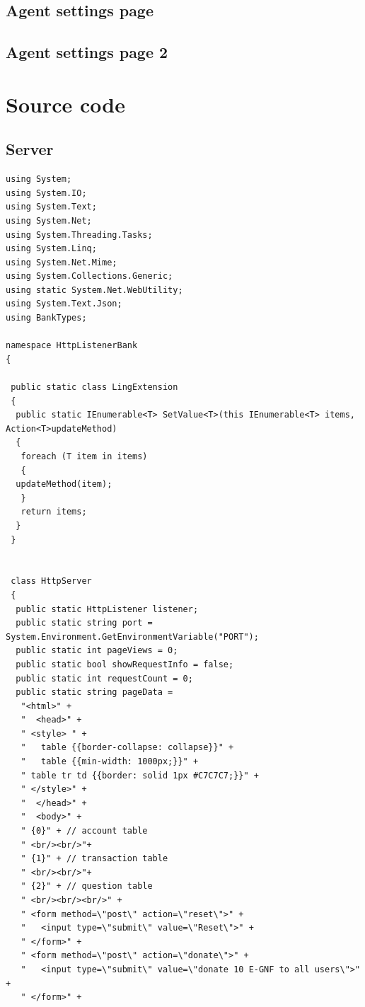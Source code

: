 \documentclass[11pt, a4paper]{article}
\begin{document}
\begin{appendices}

\subsection{Agent settings page} %
\label{sub:agent_settings_page}


\subsection{Agent settings page 2} %
\label{sub:agent_settings_page_2}


\section{Source code}
\subsection{Server} %
\label{sub:server}
\begin{lstlisting}
using System;
using System.IO;
using System.Text;
using System.Net;
using System.Threading.Tasks;
using System.Linq;
using System.Net.Mime;
using System.Collections.Generic;
using static System.Net.WebUtility;
using System.Text.Json;
using BankTypes;

namespace HttpListenerBank
{

 public static class LingExtension
 {
  public static IEnumerable<T> SetValue<T>(this IEnumerable<T> items, Action<T>updateMethod)
  {
   foreach (T item in items)
   {
  updateMethod(item);
   }
   return items;
  }
 }


 class HttpServer
 {
  public static HttpListener listener;
  public static string port = System.Environment.GetEnvironmentVariable("PORT");
  public static int pageViews = 0;
  public static bool showRequestInfo = false;
  public static int requestCount = 0;
  public static string pageData =
   "<html>" +
   "  <head>" +
   " <style> " +
   "   table {{border-collapse: collapse}}" +
   "   table {{min-width: 1000px;}}" +
   " table tr td {{border: solid 1px #C7C7C7;}}" +
   " </style>" +
   "  </head>" +
   "  <body>" +
   " {0}" + // account table
   " <br/><br/>"+
   " {1}" + // transaction table
   " <br/><br/>"+
   " {2}" + // question table
   " <br/><br/><br/>" +
   " <form method=\"post\" action=\"reset\">" +
   "   <input type=\"submit\" value=\"Reset\">" +
   " </form>" +
   " <form method=\"post\" action=\"donate\">" +
   "   <input type=\"submit\" value=\"donate 10 E-GNF to all users\">" +
   " </form>" +


\end{lstlisting}
\end{appendices}
\end{document}
